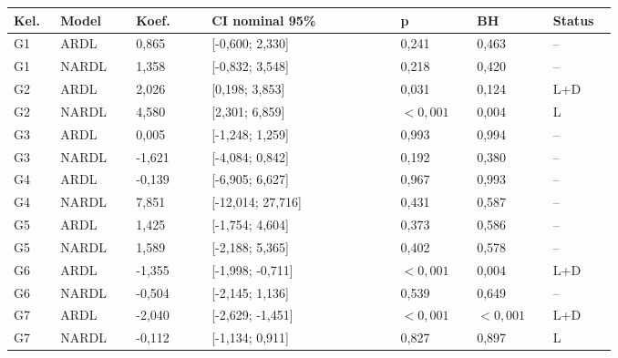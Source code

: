 {\small\setlength{\tabcolsep}{3pt}\renewcommand{\arraystretch}{1.15}
\begin{tabular}{p{0.05\linewidth}p{0.105\linewidth}p{0.1\linewidth}p{0.25\linewidth}p{0.1\linewidth}p{0.1\linewidth}p{0.07\linewidth}}
\toprule
\textbf{Kel.} & \textbf{Model} & \textbf{Koef.} & \textbf{CI nominal 95\%} & \textbf{p} & \textbf{BH} & \textbf{Status}\\
\midrule
G1 & ARDL & 0,865 & [-0,600; 2,330] & 0,241 & 0,463 & --\\
G1 & NARDL & 1,358 & [-0,832; 3,548] & 0,218 & 0,420 & --\\
G2 & ARDL & 2,026 & [0,198; 3,853] & 0,031 & 0,124 & L+D\\
G2 & NARDL & 4,580 & [2,301; 6,859] & \(<0{,}001\) & 0,004 & L\\
G3 & ARDL & 0,005 & [-1,248; 1,259] & 0,993 & 0,994 & --\\
G3 & NARDL & -1,621 & [-4,084; 0,842] & 0,192 & 0,380 & --\\
G4 & ARDL & -0,139 & [-6,905; 6,627] & 0,967 & 0,993 & --\\
G4 & NARDL & 7,851 & [-12,014; 27,716] & 0,431 & 0,587 & --\\
G5 & ARDL & 1,425 & [-1,754; 4,604] & 0,373 & 0,586 & --\\
G5 & NARDL & 1,589 & [-2,188; 5,365] & 0,402 & 0,578 & --\\
G6 & ARDL & -1,355 & [-1,998; -0,711] & \(<0{,}001\) & 0,004 & L+D\\
G6 & NARDL & -0,504 & [-2,145; 1,136] & 0,539 & 0,649 & --\\
G7 & ARDL & -2,040 & [-2,629; -1,451] & \(<0{,}001\) & \(<0{,}001\) & L+D\\
G7 & NARDL & -0,112 & [-1,134; 0,911] & 0,827 & 0,897 & L\\
\bottomrule
\end{tabular}
}